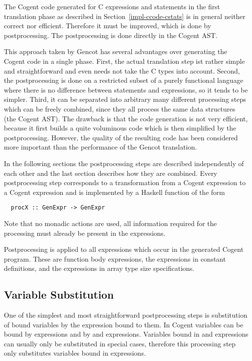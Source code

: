 The Cogent code generated for C expressions and statements in the first translation phase as described in 
Section~\ref{impl-ccode-cstats} is in general neither correct nor efficient. Therefore it must be improved, 
which is done by postprocessing. The postprocessing is done directly in the Cogent AST. 

This approach taken by Gencot has several advantages over generating the Cogent code in a single phase.
First, the actual translation step ist rather simple and straightforward and even needs not take the C types
into account. Second, the postprocessing is done on a restricted subset of a purely functional language where 
there is no difference between statements and expressions, so it tends to be simpler. Third, it can be separated
into arbitrary many different processing steps which can be freely combined, since they all process the same
data structures (the Cogent AST). The drawback is that the code generation is not very efficient, because it
first builds a quite voluminous code which is then simplified by the postprocessing. However, the quality 
of the resulting code has been considered more important than the performance of the Gencot translation.

In the following sections the postprocessing steps are described independently of each other and the last
section describes how they are combined. Every postprocessing step corresponds to a transformation from
a Cogent expression to a Cogent expression and is implemented by a Haskell function of the form
\begin{verbatim}
  procX :: GenExpr -> GenExpr
\end{verbatim}
Note that no monadic actions are used, all information required for the processing must already be present in the 
expressions.

Postprocessing is applied to all expressions which occur in the generated Cogent program. These are function 
body expressions, the expressions in constant definitions, and the expressions in array type size specifications.

\subsection{Variable Substitution}
\label{imp-post-vsubst}

One of the simplest and most straightforward postprocessing steps is substitution of bound variables by the
expression bound to them. In Cogent variables can be bound by  expressions and by  and 
expressions. Variables bound in  and  expressions can usually only be substituted in special cases, 
therefore this processing step only substitutes variables bound in  expressions. 

